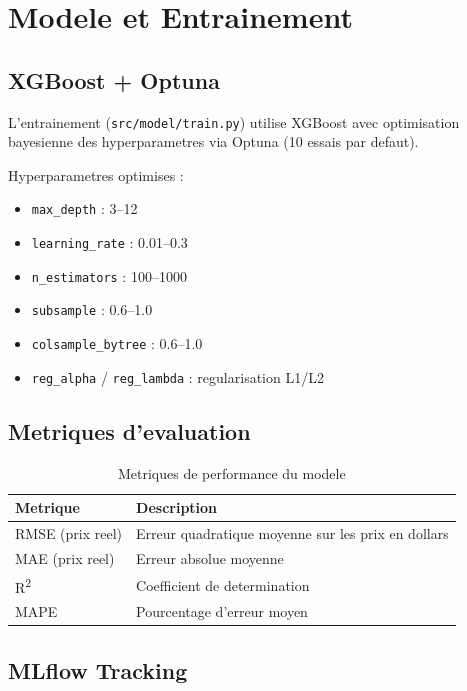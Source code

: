 \documentclass[a4paper,11pt]{article}
\begin{document}
\section{Modele et Entrainement}

\subsection{XGBoost + Optuna}

L'entrainement (\texttt{src/model/train.py}) utilise XGBoost avec optimisation
bayesienne des hyperparametres via Optuna (10 essais par defaut).

Hyperparametres optimises :
\begin{itemize}
    \item \texttt{max\_depth} : 3--12
    \item \texttt{learning\_rate} : 0.01--0.3
    \item \texttt{n\_estimators} : 100--1000
    \item \texttt{subsample} : 0.6--1.0
    \item \texttt{colsample\_bytree} : 0.6--1.0
    \item \texttt{reg\_alpha} / \texttt{reg\_lambda} : regularisation L1/L2
\end{itemize}

\subsection{Metriques d'evaluation}

\begin{table}[h]
\centering
\begin{tabular}{ll}
\toprule
\textbf{Metrique} & \textbf{Description} \\
\midrule
RMSE (prix reel) & Erreur quadratique moyenne sur les prix en dollars \\
MAE (prix reel) & Erreur absolue moyenne \\
R\textsuperscript{2} & Coefficient de determination \\
MAPE & Pourcentage d'erreur moyen \\
\bottomrule
\end{tabular}
\caption{Metriques de performance du modele}
\end{table}

\subsection{MLflow Tracking}
\end{document}
